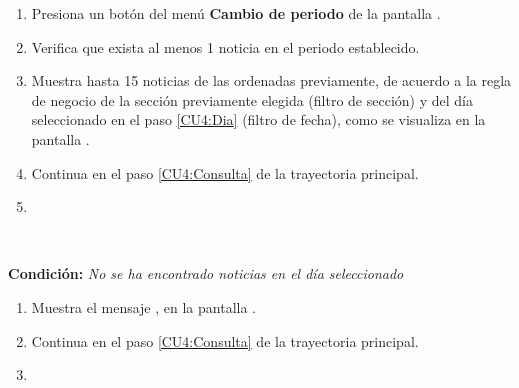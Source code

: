 \begin{enumerate}[{B-}1.]

	\item \actor \label{CU4:Dia}Presiona un botón del menú \textbf{Cambio de periodo} de la pantalla .

	\item \sistema Verifica que exista al menos 1 noticia en el periodo establecido. 

	\item \sistema Muestra hasta 15 noticias de las ordenadas previamente, de acuerdo a la regla de negocio  de la sección previamente elegida (filtro de sección) y del día seleccionado en el paso \ref{CU4:Dia} (filtro de fecha), como se visualiza en la pantalla .

	\item \sistema Continua en el paso \ref{CU4:Consulta} de la trayectoria principal.

	\item \finTA

\end{enumerate}


\begin{large}
	\\
\end{large}	
\textbf{Condición:} \textit{No se ha encontrado noticias en el día seleccionado }

\begin{enumerate}[{C-}1.]

	\item \sistema Muestra el mensaje , en la pantalla .

	\item \sistema Continua en el paso \ref{CU4:Consulta} de la trayectoria principal.

	\item \finTA

\end{enumerate}

